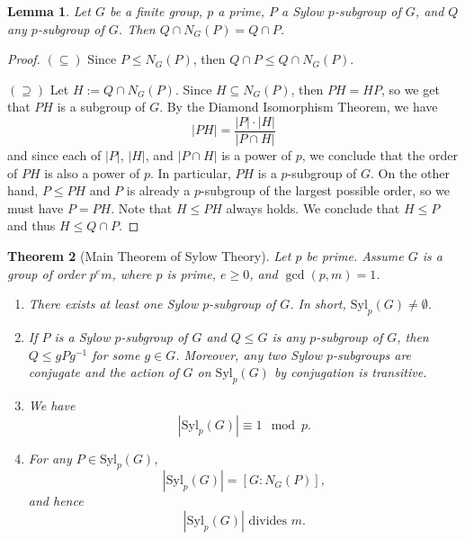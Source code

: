 \documentclass[12pt]{report}
\newtheorem{theorem}{Theorem}[chapter]
\newtheorem{lemma}[theorem]{Lemma}
\numberwithin{equation}{section}
\numberwithin{theorem}{chapter}
\theoremstyle{definition}
\newtheorem*{basic properties}{Basic Properties}
\newtheorem*{Important Remark}{Important Remark}
\begin{document}
\begin{lemma}\label{lemma Sylow normalizer}
Let $G$ be a finite group, $p$ a prime, $P$ a Sylow $p$-subgroup of $G$, and $Q$ any $p$-subgroup of $G$. Then $Q \cap N_G(P) = Q \cap P$.	
\end{lemma}


\begin{proof}
$(\subseteq)$ Since $P \leq N_G(P)$, then $Q \cap P \leq Q \cap N_G(P)$. 

$(\supseteq)$ Let $H :=  Q \cap N_G(P)$. Since $H \subseteq N_G(P)$, then $PH=HP$, so  we get that $PH$ is a subgroup of $G$. 
By the Diamond Isomorphism Theorem, we have
$$|PH| = \frac{|P| \cdot |H|}{|P \cap H|}$$
and since each of $|P|$, $|H|$, and $|P \cap H|$ is a power of $p$, we conclude that the order of $PH$ is also a power of $p$. In particular, $PH$ is a $p$-subgroup of $G$. On the other hand, $P \leq PH$ and $P$ is already a $p$-subgroup of the largest possible order, so we must have $P = PH$. Note that $H \leq PH$ always holds. We conclude that $H \leq P$ and thus $H \leq Q \cap P$.
\end{proof}






\begin{theorem}[Main Theorem of Sylow Theory]\label{Sylow}
Let $p$ be prime.
Assume $G$ is a group of order $p^e m$, where $p$ is prime, $e \geqslant 0$, and $\gcd(p,m) = 1$. 

\begin{enumerate}[itemsep=-0.1em,leftmargin=21pt]
\item There exists at least one Sylow $p$-subgroup of $G$. In short, $\mathrm{Syl}_p(G) \neq \emptyset$.

\item If $P$ is a Sylow $p$-subgroup of $G$ and $Q \leq G$ is any $p$-subgroup of $G$, then $Q \leq gPg^{-1}$ for some $g \in G$. Moreover, any two Sylow $p$-subgroups are conjugate and the action of $G$ on $\mathrm{Syl}_p(G)$ by conjugation is transitive.

\item We have
$$| \mathrm{Syl}_p(G)| \equiv 1 \mod{p}.$$
\item For any $P \in \mathrm{Syl}_p(G)$, 
$$|\mathrm{Syl}_p(G)| = [G: N_G(P)],$$
and hence
$$| \mathrm{Syl}_p(G)| \text{ divides } m.$$
\end{enumerate}
\end{theorem}
\end{document}
